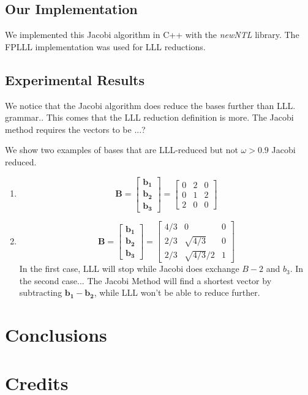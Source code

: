 \documentclass[10pt, a4paper]{article}
\newcommand{\my}[1]{{\color{blue} #1 }}
\renewcommand{\vec}[1]{\mathbf{#1}}
\begin{document}
\subsection{Our Implementation}

We implemented this Jacobi algorithm in C++ with the \emph{newNTL} library. The FPLLL implementation was used for LLL reductions.

\subsection{Experimental Results}

We notice that the Jacobi algorithm does reduce the bases further than LLL. \my{grammar.. } This comes that the LLL reduction definition is more.
The Jacobi method requires the vectors to be \my{...?}

We show two examples of bases that are LLL-reduced but not $\omega > 0.9$ Jacobi reduced.
\begin{enumerate}

\item \[
\vec{B} = \begin{bmatrix}
  \vec{b_1} \\
  \vec{b_2} \\
  \vec{b_3}
 \end{bmatrix} = \begin{bmatrix}
  0 & 2 & 0 \\
  0 & 1 & 2 \\
  2 & 0 & 0
 \end{bmatrix}
\]


\item \[
\vec{B} = \begin{bmatrix}
  \vec{b_1} \\
  \vec{b_2} \\
  \vec{b_3}
 \end{bmatrix} = \begin{bmatrix}
  4/3 & 0 & 0 \\
  2/3 & \sqrt{4/3} & 0 \\
  2/3 & \sqrt{4/3}/2 & 1
 \end{bmatrix}
\]
\my{In the first case, LLL will stop while Jacobi does exchange $B-2$ and $b_3$. In the second case...}
The Jacobi Method will find a shortest vector by subtracting $\vec{b_1}-\vec{b_2}$, while LLL won't be able to reduce further.
\end{enumerate}


\section{Conclusions}




\section{Credits}
\end{document}
